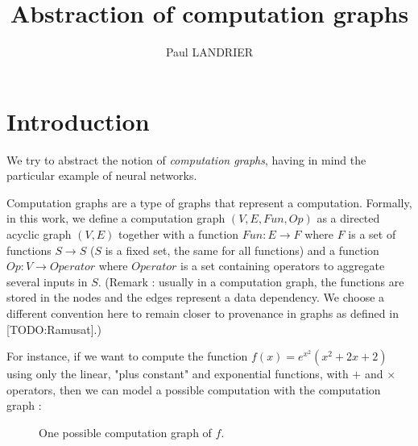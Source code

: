 \documentclass[11pt,a4paper]{article}
\author{Paul LANDRIER}
\title{Abstraction of computation graphs}
\date{}
\begin{document}
\maketitle

\section{Introduction}

We try to abstract the notion of \textit{computation graphs}, having in mind the particular example of neural networks.

	Computation graphs are a type of graphs that represent a computation. Formally, in this work, we define a computation graph $(V,E,Fun,Op)$ as a directed acyclic graph $(V,E)$ together with a function $Fun:E \to F$ where $F$ is a set of functions $S \to S$ ($S$ is a fixed set, the same for all functions) and a function $Op:V \to Operator$ where $Operator$ is a set containing operators to aggregate several inputs in $S$. (Remark : usually in a computation graph, the functions are stored in the nodes and the edges represent a data dependency. We choose a different convention here to remain closer to provenance in graphs as defined in [TODO:Ramusat].)
	
	For instance, if we want to compute the function $f(x)=e^{x^2}(x^2 + 2x + 2)$ using only the linear, "plus constant" and exponential functions, with $+$ and $\times$ operators, then we can model a possible computation with the computation graph :
	
	\begin{figure}[!h]
	\centering
	\caption{One possible computation graph of $f$.}
	\label{fig:graphe_calc_ex}
	\end{figure}
	
\end{document}
